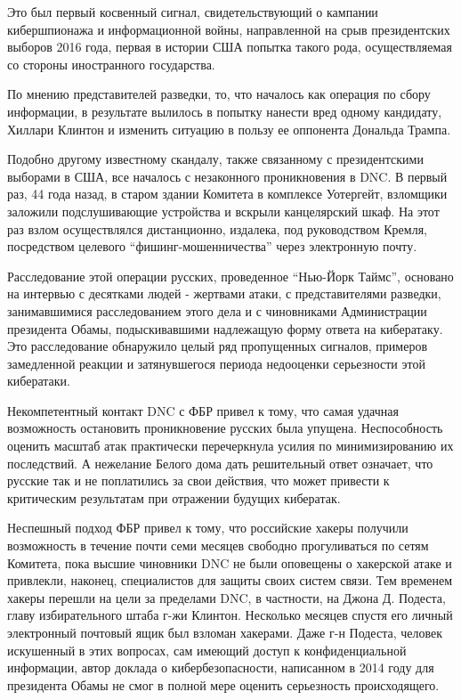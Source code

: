 Это был первый косвенный сигнал, свидетельствующий о кампании
кибершпионажа и информационной войны, направленной на срыв президентских
выборов 2016 года, первая в истории США попытка такого рода,
осуществляемая со стороны иностранного государства.

По мнению представителей разведки, то, что началось как операция по
сбору информации, в результате вылилось в попытку нанести вред одному
кандидату, Хиллари Клинтон и изменить ситуацию в пользу ее оппонента
Дональда Трампа.

Подобно другому известному скандалу, также связанному с президентскими
выборами в США, все началось с незаконного проникновения в DNC. В первый
раз, 44 года назад, в старом здании Комитета в комплексе Уотергейт,
взломщики заложили подслушивающие устройства и вскрыли канцелярский
шкаф. На этот раз взлом осуществлялся дистанционно, издалека, под
руководством Кремля, посредством целевого ``фишинг-мошенничества'' через
электронную почту.

Расследование этой операции русских, проведенное ``Нью-Йорк Таймс'',
основано на интервью с десятками людей - жертвами атаки, с
представителями разведки, занимавшимися расследованием этого дела и с
чиновниками Администрации президента Обамы, подыскивавшими надлежащую
форму ответа на кибератаку. Это расследование обнаружило целый ряд
пропущенных сигналов, примеров замедленной реакции и затянувшегося
периода недооценки серьезности этой кибератаки.

Некомпетентный контакт DNC с ФБР привел к тому, что самая удачная
возможность остановить проникновение русских была упущена. Неспособность
оценить масштаб атак практически перечеркнула усилия по минимизированию
их последствий. А нежелание Белого дома дать решительный ответ означает,
что русские так и не поплатились за свои действия, что может привести к
критическим результатам при отражении будущих кибератак.

Неспешный подход ФБР привел к тому, что российские хакеры получили
возможность в течение почти семи месяцев свободно прогуливаться по сетям
Комитета, пока высшие чиновники DNC не были оповещены о хакерской атаке
и привлекли, наконец, специалистов для защиты своих систем связи. Тем
временем хакеры перешли на цели за пределами DNC, в частности, на Джона
Д. Подеста, главу избирательного штаба г-жи Клинтон. Несколько месяцев
спустя его личный электронный почтовый ящик был взломан хакерами. Даже
г-н Подеста, человек искушенный в этих вопросах, сам имеющий доступ к
конфиденциальной информации, автор доклада о кибербезопасности,
написанном в 2014 году для президента Обамы не смог в полной мере
оценить серьезность происходящего.

